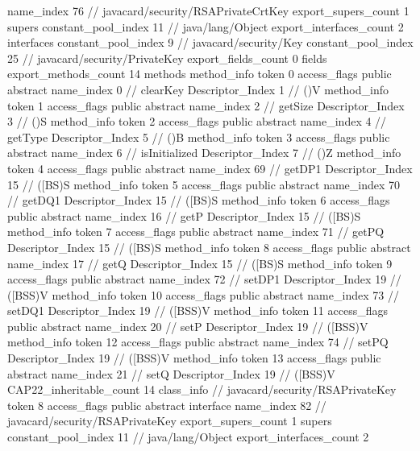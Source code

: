 {{{			name_index	76		// javacard/security/RSAPrivateCrtKey
			export_supers_count	1
			supers {
				constant_pool_index	11		// java/lang/Object
			}
			export_interfaces_count	2
			interfaces {
				constant_pool_index	9		// javacard/security/Key
				constant_pool_index	25		// javacard/security/PrivateKey
			}
			export_fields_count	0
			fields {
			}
			export_methods_count	14
			methods {
				method_info {
					token	0
					access_flags	public abstract
					name_index	0		// clearKey
					Descriptor_Index	1		// ()V
				}
				method_info {
					token	1
					access_flags	public abstract
					name_index	2		// getSize
					Descriptor_Index	3		// ()S
				}
				method_info {
					token	2
					access_flags	public abstract
					name_index	4		// getType
					Descriptor_Index	5		// ()B
				}
				method_info {
					token	3
					access_flags	public abstract
					name_index	6		// isInitialized
					Descriptor_Index	7		// ()Z
				}
				method_info {
					token	4
					access_flags	public abstract
					name_index	69		// getDP1
					Descriptor_Index	15		// ([BS)S
				}
				method_info {
					token	5
					access_flags	public abstract
					name_index	70		// getDQ1
					Descriptor_Index	15		// ([BS)S
				}
				method_info {
					token	6
					access_flags	public abstract
					name_index	16		// getP
					Descriptor_Index	15		// ([BS)S
				}
				method_info {
					token	7
					access_flags	public abstract
					name_index	71		// getPQ
					Descriptor_Index	15		// ([BS)S
				}
				method_info {
					token	8
					access_flags	public abstract
					name_index	17		// getQ
					Descriptor_Index	15		// ([BS)S
				}
				method_info {
					token	9
					access_flags	public abstract
					name_index	72		// setDP1
					Descriptor_Index	19		// ([BSS)V
				}
				method_info {
					token	10
					access_flags	public abstract
					name_index	73		// setDQ1
					Descriptor_Index	19		// ([BSS)V
				}
				method_info {
					token	11
					access_flags	public abstract
					name_index	20		// setP
					Descriptor_Index	19		// ([BSS)V
				}
				method_info {
					token	12
					access_flags	public abstract
					name_index	74		// setPQ
					Descriptor_Index	19		// ([BSS)V
				}
				method_info {
					token	13
					access_flags	public abstract
					name_index	21		// setQ
					Descriptor_Index	19		// ([BSS)V
				}
			}
			CAP22_inheritable_count	14
		}
		class_info {		// javacard/security/RSAPrivateKey
			token	8
			access_flags	public abstract interface
			name_index	82		// javacard/security/RSAPrivateKey
			export_supers_count	1
			supers {
				constant_pool_index	11		// java/lang/Object
			}
			export_interfaces_count	2
}}}
